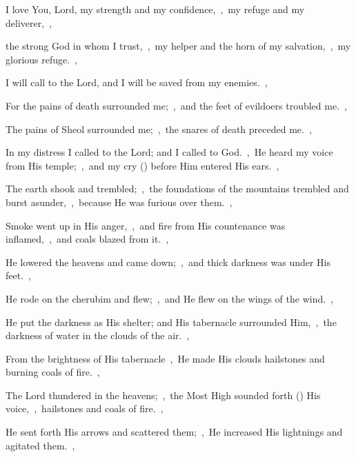 \documentclass[12pt,twoside,a5paper]{article}
\begin{document}


\begin{normalparskip}
  I love You, Lord, my strength and my confidence,~\sep\ my refuge and my deliverer,~\sep


  the strong God in whom I trust,~\sep\ my helper and the horn of my salvation,~\sep\ my glorious refuge.~\sep

  I will call to the Lord, and I will be saved from my enemies.~\sep

  For the pains of death surrounded me;~\sep\ and the feet of evildoers troubled me.~\sep

  The pains of Sheol surrounded me;~\sep\ the snares of death preceded me.~\sep

  In my distress I called to the Lord; and I called to God.~\sep\ He heard my voice from His temple;~\sep\ and my cry () before Him entered His ears.~\sep

  The earth shook and trembled;~\sep\ the foundations of the mountains trembled and burst asunder,~\sep\ because He was furious over them.~\sep

  Smoke went up in His anger,~\sep\ and fire from His countenance was inflamed,~\sep\ and coals blazed from it.~\sep

  He lowered the heavens and came down;~\sep\ and thick darkness was under His feet.~\sep

  He rode on the cherubim and flew;~\sep\ and He flew on the wings of the wind.~\sep

  He put the darkness as His shelter; and His tabernacle surrounded Him,~\sep\ the darkness of water in the clouds of the air.~\sep

  From the brightness of His tabernacle~\sep\ He made His clouds hailstones and burning coals of fire.~\sep

  The Lord thundered in the heavens;~\sep\ the Most High sounded forth () His voice,~\sep\ hailstones and coals of fire.~\sep

  He sent forth His arrows and scattered them;~\sep\ He increased His lightnings and agitated them.~\sep


\end{normalparskip}
\end{document}
